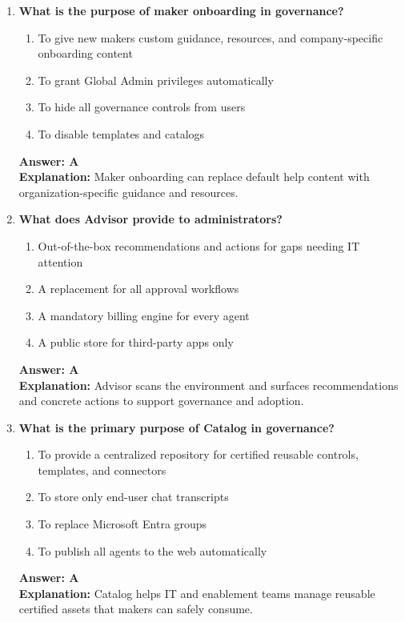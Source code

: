 \documentclass[10pt]{article}
\begin{document}
\begin{enumerate}[leftmargin=*]
\item \textbf{What is the purpose of maker onboarding in governance?}
\begin{enumerate}[label=\Alph*.]
  \item To give new makers custom guidance, resources, and company-specific onboarding content
  \item To grant Global Admin privileges automatically
  \item To hide all governance controls from users
  \item To disable templates and catalogs
\end{enumerate}
\textbf{Answer: A}\\
\textbf{Explanation:} Maker onboarding can replace default help content with organization-specific guidance and resources.

\item \textbf{What does Advisor provide to administrators?}
\begin{enumerate}[label=\Alph*.]
  \item Out-of-the-box recommendations and actions for gaps needing IT attention
  \item A replacement for all approval workflows
  \item A mandatory billing engine for every agent
  \item A public store for third-party apps only
\end{enumerate}
\textbf{Answer: A}\\
\textbf{Explanation:} Advisor scans the environment and surfaces recommendations and concrete actions to support governance and adoption.

\item \textbf{What is the primary purpose of Catalog in governance?}
\begin{enumerate}[label=\Alph*.]
  \item To provide a centralized repository for certified reusable controls, templates, and connectors
  \item To store only end-user chat transcripts
  \item To replace Microsoft Entra groups
  \item To publish all agents to the web automatically
\end{enumerate}
\textbf{Answer: A}\\
\textbf{Explanation:} Catalog helps IT and enablement teams manage reusable certified assets that makers can safely consume.


\end{enumerate}
\end{document}
